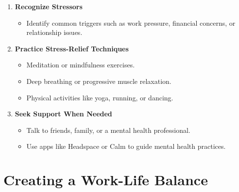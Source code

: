 \documentclass[
  letterpaper,
  DIV=11,
  numbers=noendperiod]{scrreprt}
\providecommand{\tightlist}{%
  \setlength{\itemsep}{0pt}\setlength{\parskip}{0pt}}\usepackage{longtable,booktabs,array}
\begin{document}
\begin{enumerate}
\def\labelenumi{\arabic{enumi}.}
\item
  \textbf{Recognize Stressors}

  \begin{itemize}
  \tightlist
  \item
    Identify common triggers such as work pressure, financial concerns,
    or relationship issues.
  \end{itemize}
\item
  \textbf{Practice Stress-Relief Techniques}

  \begin{itemize}
  \tightlist
  \item
    Meditation or mindfulness exercises.
  \item
    Deep breathing or progressive muscle relaxation.
  \item
    Physical activities like yoga, running, or dancing.
  \end{itemize}
\item
  \textbf{Seek Support When Needed}

  \begin{itemize}
  \tightlist
  \item
    Talk to friends, family, or a mental health professional.
  \item
    Use apps like Headspace or Calm to guide mental health practices.
  \end{itemize}
\end{enumerate}

\section{Creating a Work-Life
Balance}\label{creating-a-work-life-balance}
\end{document}
